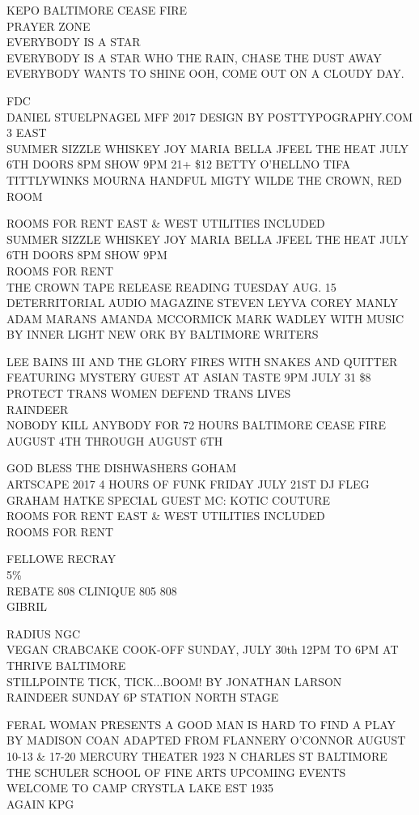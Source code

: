 \documentclass[10pt,letterpaper]{article}
\begin{document}
KEPO BALTIMORE CEASE FIRE\\
PRAYER ZONE\\
EVERYBODY IS A STAR\\
EVERYBODY IS A STAR WHO THE RAIN, CHASE THE DUST AWAY EVERYBODY WANTS TO SHINE OOH, COME OUT ON A CLOUDY DAY.

FDC\\
DANIEL STUELPNAGEL MFF 2017 DESIGN BY POSTTYPOGRAPHY.COM\\
3 EAST\\
SUMMER SIZZLE WHISKEY JOY MARIA BELLA JFEEL THE HEAT JULY 6TH DOORS 8PM SHOW 9PM 21+ \$12 BETTY O'HELLNO TIFA TITTLYWINKS MOURNA HANDFUL MIGTY WILDE THE CROWN, RED ROOM

ROOMS FOR RENT EAST \& WEST UTILITIES INCLUDED\\
SUMMER SIZZLE WHISKEY JOY MARIA BELLA JFEEL THE HEAT JULY 6TH DOORS 8PM SHOW 9PM\\
ROOMS FOR RENT\\
THE CROWN TAPE RELEASE READING TUESDAY AUG. 15 DETERRITORIAL AUDIO MAGAZINE STEVEN LEYVA COREY MANLY ADAM MARANS AMANDA MCCORMICK MARK WADLEY WITH MUSIC BY INNER LIGHT NEW ORK BY BALTIMORE WRITERS

LEE BAINS III AND THE GLORY FIRES WITH SNAKES AND QUITTER FEATURING MYSTERY GUEST AT ASIAN TASTE 9PM JULY 31 \$8\\
PROTECT TRANS WOMEN DEFEND TRANS LIVES\\
RAINDEER\\
NOBODY KILL ANYBODY FOR 72 HOURS BALTIMORE CEASE FIRE AUGUST 4TH THROUGH AUGUST 6TH

GOD BLESS THE DISHWASHERS GOHAM\\
ARTSCAPE 2017 4 HOURS OF FUNK FRIDAY JULY 21ST DJ FLEG GRAHAM HATKE SPECIAL GUEST MC: KOTIC COUTURE\\
ROOMS FOR RENT EAST \& WEST UTILITIES INCLUDED\\
ROOMS FOR RENT

FELLOWE RECRAY\\
5\%\\
REBATE 808 CLINIQUE 805 808\\
GIBRIL

RADIUS NGC\\
VEGAN CRABCAKE COOK{-}OFF SUNDAY, JULY 30th 12PM TO 6PM AT THRIVE BALTIMORE\\
STILLPOINTE TICK, TICK...BOOM!  BY JONATHAN LARSON\\
RAINDEER SUNDAY 6P STATION NORTH STAGE

FERAL WOMAN PRESENTS A GOOD MAN IS HARD TO FIND A PLAY BY MADISON COAN ADAPTED FROM FLANNERY O'CONNOR AUGUST 10{-}13 \& 17{-}20 MERCURY THEATER 1923 N CHARLES ST BALTIMORE\\
THE SCHULER SCHOOL OF FINE ARTS UPCOMING EVENTS\\
WELCOME TO CAMP CRYSTLA LAKE EST 1935\\
AGAIN KPG
\end{document}
